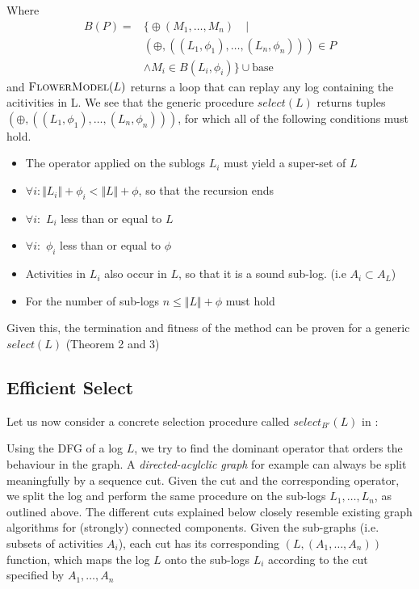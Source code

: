 \documentclass[a4paper]{IEEEtran}
\begin{document}
Where
\begin{align*}
B(P) = & \Big\{ \oplus (M_1, \dots ,M_n) \quad | \\ &(\oplus, ((L_1, \phi_1), \dots, (L_n, \phi_n))) \in P \\ &\wedge M_i \in B(L_i, \phi_i) \Big\} \cup \text{base}
\end{align*}
and $\textproc{FlowerModel}(L)$ returns a loop that can replay any log containing the acitivities in L.
We see that the generic procedure $select(L)$ returns tuples $(\oplus, ((L_1, \phi_1), \dots, (L_n, \phi_n)))$, for which all of the following conditions must hold.
\begin{itemize}
    \item The operator applied on the sublogs $L_i$ must yield a super-set of $L$
    \item $\forall i : \Vert L_i \Vert + \phi_i < \Vert L \Vert + \phi $, so that the recursion ends
    \item $\forall i :$ $L_i$ less than or equal to $L$
    \item $\forall i :$ $\phi_i$ less than or equal to $\phi$
    \item Activities in $L_i$ also occur in $L$, so that it is a sound sub-log. (i.e $A_i \subset A_L$)
    \item For the number of sub-logs $n \leq \Vert L \Vert + \phi$ must hold
\label{list:properties}
\end{itemize}
Given this, the termination and fitness of the method can be proven for a generic $select(L)$ \cite{inductivemining-constructive} (Theorem 2 and 3)

\subsection{Efficient Select} %
\label{ssub:efficientselect}
Let us now consider a concrete selection procedure called $select_{B'}(L)$ in \cite{inductivemining-constructive}:

Using the DFG of a log $L$, we try to find the dominant operator that orders the behaviour in the graph. A \textit{directed-acylclic graph} for example can always be split meaningfully by a sequence cut. Given the cut and the corresponding operator, we split the log and perform the same procedure on the sub-logs $L_1, \dots, L_n$, as outlined above. The different cuts explained below closely resemble existing graph algorithms for (strongly) connected components. Given the sub-graphs (i.e. subsets of activities $A_i$), each cut has its corresponding $(L, (A_1, \dots, A_n))$ function, which maps the log $L$ onto the sub-logs $L_i$ according to the cut specified by $A_1, \dots, A_n$
\end{document}
